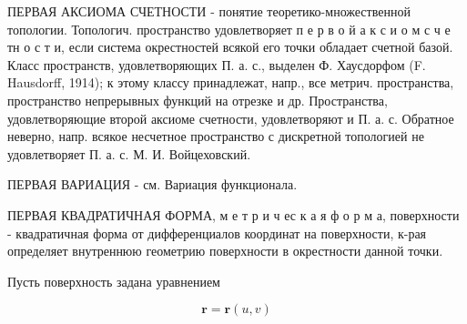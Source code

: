\documentclass[10pt]{article}
\begin{document}
ПЕРВАЯ АКСИОМА СЧЕТНОСТИ - понятие теоретико-множественной топологии. Топологич. пространство удовлетворяет п е р в о й а к с и о м с ч е тн о с т и, если система окрестностей всякой его точки обладает счетной базой. Класс пространств, удовлетворяющих П. а. с., выделен Ф. Хаусдорфом (F. Hausdorff, 1914); к этому классу принадлежат, напр., все метрич. пространства, пространство непрерывных функций на отрезке и др. Пространства, удовлетворяющие второй аксиоме счетности, удовлетворяют и П. а. с. Обратное неверно, напр. всякое несчетное пространство с дискретной топологией не удовлетворяет П. а. с. М. И. Войцеховский.

ПЕРВАЯ ВАРИАЦИЯ - см. Вариация функционала.

ПЕРВАЯ КВАДРАТИЧНАЯ ФОРМА, м е т р и ч ес к а я ф о р м а, поверхности - квадратичная форма от дифференциалов координат на поверхности, к-рая определяет внутреннюю геометрию поверхности в окрестности данной точки.

Пусть поверхность задана уравнением

\[
\boldsymbol{r}=\boldsymbol{r}(u, v)
\]
\end{document}
